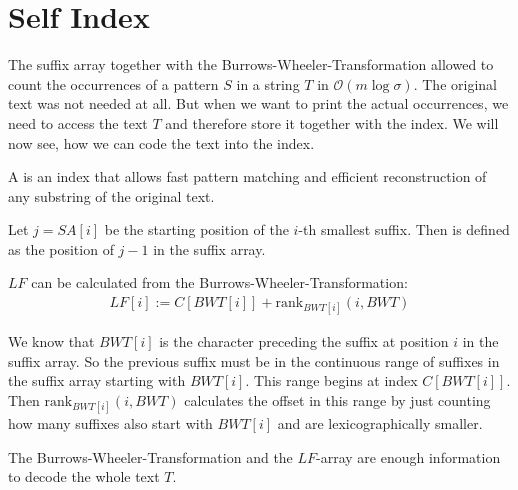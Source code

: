 \section{Self Index}

The suffix array together with the Burrows-Wheeler-Transformation allowed to count the occurrences of a pattern $S$ in a string $T$ in $\mathcal{O}(m\log\sigma)$. The original text was not needed at all. But when we want to print the actual occurrences, we need to access the text $T$ and therefore store it together with the index. We will now see, how we can code the text into the index.

\begin{Definition}
  A  is an index that allows fast pattern matching and efficient reconstruction of any substring of the original text.
\end{Definition}

\begin{Definition}
  Let $j = SA[i]$ be the starting position of the $i$-th smallest suffix. Then  is defined as the position of $j-1$ in the suffix array.
\end{Definition}

\begin{Theorem}
  $LF$ can be calculated from the Burrows-Wheeler-Transformation:
  \begin{align}
    LF[i] := C[BWT[i]] + \mathrm{rank}_{BWT[i]}(i, BWT)
    \label{eq:lfMapping}
  \end{align}
\end{Theorem}

\begin{Proof}
  We know that $BWT[i]$ is the character preceding the suffix at position $i$ in the suffix array. So the previous suffix must be in the continuous range of suffixes in the suffix array starting with $BWT[i]$. This range begins at index $C[BWT[i]]$. Then $\mathrm{rank}_{BWT[i]}(i, BWT)$ calculates the offset in this range by just counting how many suffixes also start with $BWT[i]$ and are lexicographically smaller.
\end{Proof}

\begin{Theorem}
  \label{thm:lfMapping}
  The Burrows-Wheeler-Transformation and the $LF$-array are enough information to decode the whole text $T$.
\end{Theorem}

